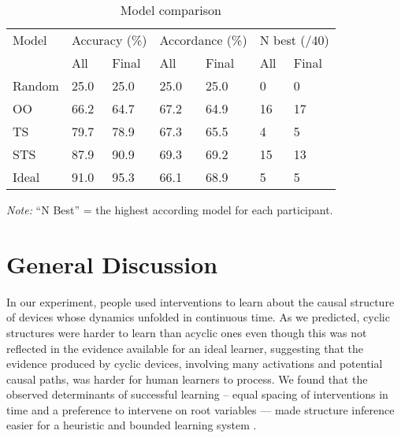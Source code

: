 \documentclass[10pt,letterpaper]{article}
\begin{document}
\begin{table}[ht]
\centering
\caption{Model comparison}
\vspace{-0.2cm}
\label{table:incremental_construction}
\footnotesize{
\begin{tabularx}{\columnwidth}{lXXXXXX}
\toprule
Model & \multicolumn{2}{l}{Accuracy (\%)}  & \multicolumn{2}{l}{Accordance (\%)}  & \multicolumn{2}{l}{N best (/40)}  \\ 
 & All & Final & All & Final & All & Final\\
\midrule
Random & 25.0 & 25.0 & 25.0 & 25.0 & 0 & 0 \\
OO & 66.2 & 64.7 & 67.2 & 64.9 & 16 & 17 \\ 
  TS & 79.7 & 78.9 & 67.3 & 65.5 &  4 &  5 \\ 
  STS & 87.9 & 90.9 & 69.3 & 69.2 & 15 & 13 \\ 
  Ideal & 91.0 & 95.3 & 66.1 & 68.9 &  5 &  5 \\
  \bottomrule
\end{tabularx}}
\footnotesize{\emph{Note:} ``N Best'' = the highest according model for each participant.}\raggedright
\vspace{-0.6cm}
\end{table}

\section{General Discussion}

In our experiment, people used interventions to learn about the causal structure of devices whose dynamics unfolded in continuous time.  As we predicted, cyclic structures were harder to learn than acyclic ones even though this was not reflected in the evidence available for an ideal learner, suggesting that the evidence produced by cyclic devices, involving many activations and potential causal paths, was harder for human learners to process.  We found that the observed determinants of successful learning -- equal spacing of interventions in time and a preference to intervene on root variables --- made structure inference easier for a heuristic and bounded learning system \citep{griffiths2015rational}.
\end{document}
